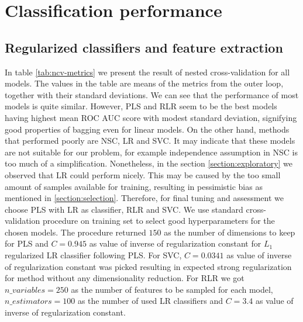 \documentclass[shortabstract, english, mgr]{iithesis}
\begin{document}
\section{Classification performance} 

\subsection{Regularized classifiers and feature extraction} \label{section:performance}

In table \ref{tab:ncv-metrics} we present the result of nested cross-validation for all models. The values in the table are means of the metrics from the outer loop, together with their standard deviations. We can see that the performance of most models is quite similar. However, PLS and RLR seem to be the best models having highest mean ROC AUC score with modest standard deviation, signifying good properties of bagging even for linear models. On the other hand, methods that performed poorly are NSC, LR and SVC. It may indicate that these models are not suitable for our problem, for example independence assumption in NSC is too much of a simplification. Nonetheless, in the section \ref{section:exploratory} we observed that LR could perform nicely. This may be caused by the too small amount of samples available for training, resulting in pessimistic bias as mentioned in \ref{section:selection}. Therefore, for final tuning and assessment we choose PLS with LR as classifier, RLR and SVC. We use standard cross-validation procedure on training set to select good hyperparameters for the chosen models. The procedure returned $150$ as the number of dimensions to keep for PLS and $C=0.945$ as value of inverse of regularization constant for $L_1$ regularized LR classifier following PLS. For SVC, $C=0.0341$ as value of inverse of regularization constant was picked resulting in expected strong regularization for method without any dimensionality reduction. For RLR we got $n\_variables=250$ as the number of features to be sampled for each model, $n\_estimators=100$ as the number of used LR classifiers and $C=3.4$ as value of inverse of regularization constant.
\end{document}
